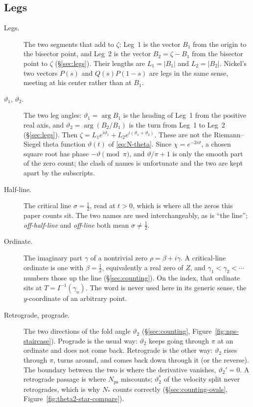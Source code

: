 \documentclass[11pt]{article}
\theoremstyle{definition}
\begin{document}
\subsection*{Legs}

\begin{description}
\item[Legs.]
The two segments that add to $\zeta$: Leg~1 is the vector $B_1$
from the origin to the bisector point, and Leg~2 is the vector
$B_2=\zeta-B_1$ from the bisector point to $\zeta$
(\S\ref{sec:legs}).
Their lengths are $L_1=|B_1|$ and $L_2=|B_2|$.
Nickel's two vectors $P(s)$ and $Q(s)P(1-s)$ are legs in the same
sense, meeting at his center rather than at $B_1$.

\item[$\vartheta_1$, $\vartheta_2$.]
The two leg angles:
$\vartheta_1=\arg B_1$ is the heading of Leg~1 from the positive
real axis, and
$\vartheta_2=\arg(B_2/B_1)$ is the turn from Leg~1 to Leg~2
(\S\ref{sec:legs}).
Then $\zeta=L_1 e^{i\vartheta_1}+L_2 e^{i(\vartheta_1+\vartheta_2)}$.
These are not the Riemann--Siegel theta function $\vartheta(t)$ of
\eqref{eq:N-theta}. Since $\chi=e^{-2i\vartheta}$, a chosen square
root has phase $-\vartheta\pmod{\pi}$, and $\vartheta/\pi+1$ is only
the smooth part of the zero count; the clash of names is unfortunate
and the two are kept apart by the subscripts.

\item[Half-line.]
The critical line $\sigma=\tfrac12$, read at $t>0$, which is where all the
zeros this paper counts sit. The two names are used interchangeably, as is
``the line''; \emph{off-half-line} and \emph{off-line} both mean
$\sigma\neq\tfrac12$.

\item[Ordinate.]
The imaginary part $\gamma$ of a nontrivial zero $\rho=\beta+i\gamma$.
A critical-line ordinate is one with $\beta=\tfrac12$, equivalently
a real zero of $Z$, and $\gamma_1<\gamma_2<\cdots$ numbers those up
the line (\S\ref{sec:counting}).
On the index, that ordinate sits at $T=I^{-1}(\gamma_n)$.
The word is never used here in its generic sense, the
$y$-coordinate of an arbitrary point.

\item[Retrograde, prograde.]
The two directions of the fold angle $\vartheta_2$
(\S\ref{sec:counting}, Figure~\ref{fig:nps-staircase}).
Prograde is the usual way: $\vartheta_2$ keeps going through
$\pi$ at an ordinate and does not come back.
Retrograde is the other way: $\vartheta_2$ rises through $\pi$,
turns around, and comes back down through it (or the reverse).
The boundary between the two is where the derivative vanishes,
$\vartheta_2'=0$.
A retrograde passage is where $N_{\mathrm{ps}}$ miscounts;
$\vartheta_2^{\ast}$ of the velocity split never retrogrades, which is
why $N_{\ast}$ counts correctly
(\S\ref{sec:counting-ovals}, Figure~\ref{fig:theta2-star-compare}).


\end{description}
\end{document}
